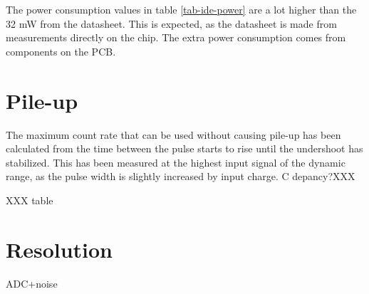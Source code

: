 \documentclass[../main/thesis.tex]{subfiles}
\begin{document}
The power consumption values in table \ref{tab-ide-power} are a lot higher than the 32 mW from the datasheet. This is expected, as the datasheet is made from measurements directly on the chip. The extra power consumption comes from components on the PCB. 

\section{Pile-up}
\label{ide-pileup}

The maximum count rate that can be used without causing pile-up has been calculated from the time between the pulse starts to rise until the undershoot has stabilized. This has been measured at the highest input signal of the dynamic range, as the pulse width is slightly increased by input charge. C depancy?XXX

XXX table

\section{Resolution}
\label{ide-resolution}
ADC+noise
\end{document}
